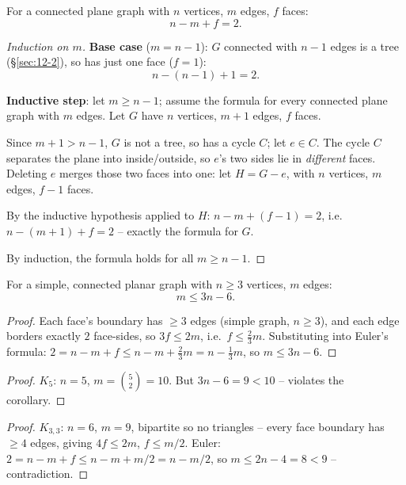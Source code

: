 \documentclass[11pt]{article}
\begin{document}
\bigskip
\begin{theorem}
For a connected plane graph with $n$ vertices, $m$ edges, $f$ faces:
\[
n-m+f = 2.
\]
\end{theorem}
\begin{proof}[Induction on $m$]
\textbf{Base case} ($m=n-1$): $G$ connected with $n-1$ edges is a tree (\S\ref{sec:12-2}), so has just one face ($f=1$):
\[
n-(n-1)+1 = 2.
\]

\medskip
\textbf{Inductive step}: let $m\ge n-1$; assume the formula for every connected plane graph with $m$ edges. Let $G$ have $n$ vertices, $m+1$ edges, $f$ faces.

Since $m+1>n-1$, $G$ is not a tree, so has a cycle $C$; let $e\in C$. The cycle $C$ separates the plane into inside/outside, so $e$'s two sides lie in \emph{different} faces. Deleting $e$ merges those two faces into one: let $H=G-e$, with $n$ vertices, $m$ edges, $f-1$ faces.

By the inductive hypothesis applied to $H$: $n-m+(f-1)=2$, i.e.\ $n-(m+1)+f=2$ -- exactly the formula for $G$.

\medskip
By induction, the formula holds for all $m\ge n-1$.
\end{proof}

\begin{corollary}
For a simple, connected planar graph with $n\ge3$ vertices, $m$ edges:
\[
m \le 3n-6.
\]
\end{corollary}
\begin{proof}
Each face's boundary has $\ge3$ edges (simple graph, $n\ge3$), and each edge borders exactly $2$ face-sides, so $3f\le 2m$, i.e.\ $f\le\frac23m$. Substituting into Euler's formula: $2=n-m+f \le n-m+\frac23m = n-\frac13m$, so $m\le3n-6$.
\end{proof}

\begin{theorem}
\end{theorem}
\begin{proof}
$K_5$: $n=5$, $m=\binom52=10$. But $3n-6=9<10$ -- violates the corollary.
\end{proof}

\begin{theorem}
\end{theorem}
\begin{proof}
$K_{3,3}$: $n=6$, $m=9$, bipartite so no triangles -- every face boundary has $\ge4$ edges, giving $4f\le2m$, $f\le m/2$. Euler: $2=n-m+f\le n-m+m/2=n-m/2$, so $m\le2n-4=8<9$ -- contradiction.
\end{proof}
\end{document}
